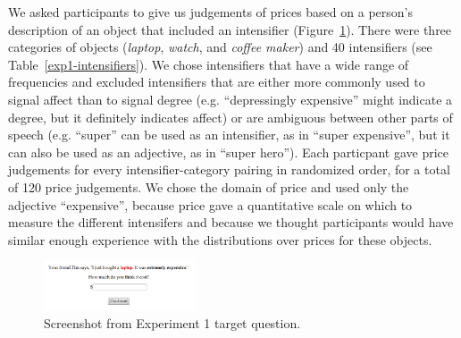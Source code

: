 \documentclass[10pt,letterpaper]{article}
\begin{document}
We asked participants to give us judgements of prices based on a person's description of an object that included an intensifier (Figure~\ref{exp1-q}).
There were three categories of objects (\emph{laptop}, \emph{watch}, and \emph{coffee maker}) and 40 intensifiers (see Table~\ref{exp1-intensifiers}).
We chose intensifiers that have a wide range of frequencies and excluded intensifiers that are either more commonly used to signal affect than to signal degree (e.g. ``depressingly expensive'' might indicate a degree, but it definitely indicates affect) or are ambiguous between other parts of speech (e.g. ``super'' can be used as an intensifier, as in ``super expensive'', but it can also be used as an adjective, as in ``super hero'').
Each particpant gave price judgements for every intensifier-category pairing in randomized order, for a total of 120 price judgements.
We chose the domain of price and used only the adjective ``expensive'', because price gave a quantitative scale on which to measure the different intensifers and because we thought participants would have similar enough experience with the distributions over prices for these objects.

\begin{figure}[ht]
\begin{center}
\includegraphics[width=0.4\textwidth]{analysis_files_for_writeup/images/exp1-q.png}
\end{center}
\caption{Screenshot from Experiment 1 target question.} 
\label{exp1-q}
\end{figure}
\end{document}
